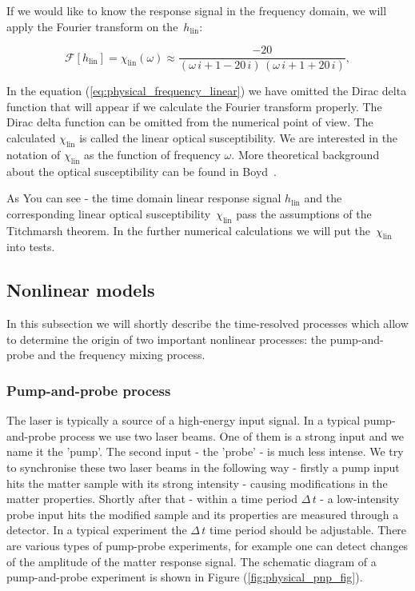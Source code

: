 \documentclass[12pt,twoside,a4paper]{article}
\numberwithin{equation}{subsection}
\numberwithin{figure}{subsection}
\begin{document}
If we would like to know the response signal in the frequency domain, we will apply the Fourier transform on the~$ h_{\text{lin}} $:

\begin{equation} \label{eq:physical_frequency_linear}
  \mathcal{F}[h_{\text{lin}}] = \chi_{\text{lin}}(\omega) \approx \frac{ -20}{(\omega \,i + 1 -20\,i)\,(\omega \,i + 1 + 20\,i)},
\end{equation}

In the equation (\ref{eq:physical_frequency_linear}) we have omitted the Dirac delta function that will appear if we calculate the Fourier
transform properly. The Dirac delta function can be omitted from the numerical point of view. The calculated $ \chi_{\text{lin}} $
is called the linear optical susceptibility. We are interested in the notation of $ \chi_{\text{lin}} $ as the function of frequency
$ \omega $. More theoretical background about the optical susceptibility can be found in Boyd~\cite{boyd_nlo}. 

As You can see - the time domain linear response signal $ h_{\text{lin}} $ and the corresponding linear optical susceptibility~$
\chi_{\text{lin}} $ pass the assumptions of the Titchmarsh theorem. In the further numerical calculations we will put the~$
\chi_{\text{lin}} $ into tests. 

\subsection{Nonlinear models} \label{chap:physical_simnlo}

In this subsection we will shortly describe the time-resolved processes which allow to determine the origin of two important nonlinear
processes: the pump-and-probe and the frequency mixing process.

\subsubsection*{Pump-and-probe process} \label{chap:physical_pnp}

The laser is typically a source of a high-energy input signal. In a typical pump-and-probe process we use two laser beams. One of them
is a strong input and we name it the 'pump'. The second input - the 'probe' - is much less intense. We try to synchronise these two
laser beams in the following way - firstly a pump input hits the matter sample with its strong intensity - causing modifications in the matter
properties. Shortly after that - within a time period $\Delta \, t$ - a low-intensity probe input hits the modified sample and its
properties are measured through a detector. In a typical experiment the $\Delta \, t$ time period should be adjustable. There are various types of
pump-probe experiments, for example one can detect changes of the amplitude of the matter response signal. The schematic diagram of a
pump-and-probe experiment is shown in Figure (\ref{fig:physical_pnp_fig}).
\end{document}
